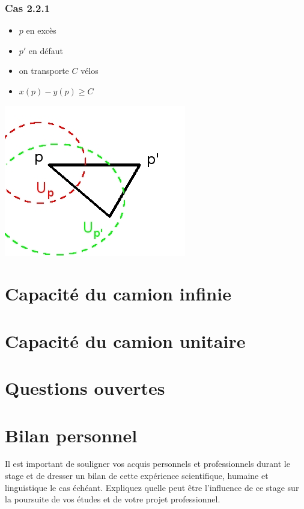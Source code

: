 \documentclass[twoside,11pt,openany,a4paper]{rapport}
\begin{document}
\subsection*{Cas 2.2.1}

\begin{minipage}{0.5\linewidth}
\begin{itemize}
\item $p$ en excès
\item $p'$ en défaut
\item on transporte $C$ vélos
\item $x(p)-y(p) \ge C$
\end{itemize}
\end{minipage}
\begin{minipage}{0.5\linewidth}
\begin{center}
\includegraphics[scale=0.5]{graphe_triangulaire_221.jpg}
\end{center}
\end{minipage}

\chapter{Capacité du camion infinie}

\chapter{Capacité du camion unitaire}

\chapter{Questions ouvertes}

\chapter*{Bilan personnel}
Il est important de souligner vos acquis personnels et professionnels durant le stage et de  dresser un bilan de cette expérience scientifique, humaine et linguistique le cas échéant. Expliquez quelle peut être l’influence de ce stage sur la poursuite de vos études et de votre projet professionnel.
\end{document}
